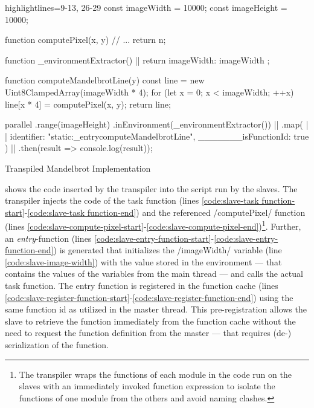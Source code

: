 \begin{listing}
	\begin{javascriptcode*}{highlightlines={9-13, 26-29}}
const imageWidth = 10000;
const imageHeight = 10000;

function computePixel(x, y) {
	// ...
	return n;
}

function _environmentExtractor() { |$\label{code:mandelbrot-environment-extractor}$|
	return {
		imageWidth: imageWidth
	};
}

function computeMandelbrotLine(y) {
	const line = new Uint8ClampedArray(imageWidth * 4);
	for (let x = 0; x < imageWidth; ++x) {
		line[x * 4] = computePixel(x, y);
	}
	return line;
}

parallel
	.range(imageHeight)
	.inEnvironment(_environmentExtractor()) |$\label{code:mandelbrot-environment-call}$|
	.map({ |$\label{code:mandelbrot-function-id-start}$|
		identifier: "static:_entrycomputeMandelbrotLine",
		_______isFunctionId: true
	}) |$\label{code:mandelbrot-function-id-end}$|
	.then(result => console.log(result));
\end{javascriptcode*}
\caption{Transpiled Mandelbrot Implementation}
\label{fig:mandelbrot-transpiled}
\end{listing}


 shows the code inserted by the transpiler into the script run by the slaves. The transpiler injects the code of the task function (lines \ref{code:slave-task function-start}-\ref{code:slave-task function-end}) and the referenced \javascriptinline/computePixel/ function (lines \ref{code:slave-compute-pixel-start}-\ref{code:slave-compute-pixel-end})\footnote{The transpiler wraps the functions of each module in the code run on the slaves with an immediately invoked function expression to isolate the functions of one module from the others and avoid naming clashes.}. Further, an \textit{entry}-function (lines \ref{code:slave-entry-function-start}-\ref{code:slave-entry-function-end}) is generated that initializes the \javascriptinline/imageWidth/ variable (line \ref{code:slave-image-width}) with the value stored in the environment --- that contains the values of the variables from the main thread --- and calls the actual task function. The entry function is registered in the function cache (lines \ref{code:slave-register-function-start}-\ref{code:slave-register-function-end}) using the same function id as utilized in the master thread. This pre-registration allows the slave to retrieve the function immediately from the function cache without the need to request the function definition from the master --- that requires (de-) serialization of the function.

